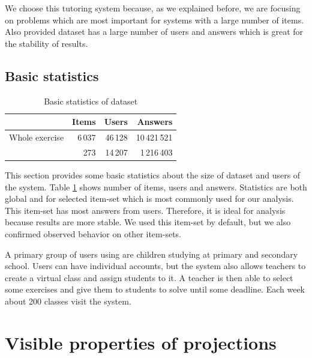 \documentclass[
  digital, %
  table,   %
  nolof,     %
  nolot,     %
  nocover,
  color,
  final, %
]{fithesis3}
\begin{document}

We choose this tutoring system because, as we explained before, we are focusing on problems which are most important for systems with a large number of items. Also provided dataset has a large number of users and answers which is great for the stability of results.


\subsection{Basic statistics}\label{basic-statistics}

\begin{table}
  \begin{tabular}{|l|r r r|}
    \hline
     & Items & Users & Answers \\
    \hline
    Whole exercise & 6\,037 & 46\,128 & 10\,421\,521 \\
    \cvicenieB{} & 273 & 14\,207 & 1\,216\,403 \\
    \hline
  \end{tabular}
  \caption{Basic statistics of dataset}
  \label{tab:basic-statistics}
\end{table}

This section provides some basic statistics about the size of dataset and users of the system. Table \ref{tab:basic-statistics} shows number of items, users and answers. Statistics are both global and for selected item-set \cvicenieB{} which is most commonly used for our analysis. This item-set has most answers from users. Therefore, it is ideal for analysis because results are more stable. We used this item-set by default, but we also confirmed observed behavior on other item-sets.


A primary group of users using \umimeCesky{} are children studying at primary and secondary school. Users can have individual accounts, but the system also allows teachers to create a virtual class and assign students to it. A teacher is then able to select some exercises and give them to students to solve until some deadline. Each week about 200 classes visit the system.


\section{Visible properties of projections}\label{visible-properties-of-projections}
\end{document}
